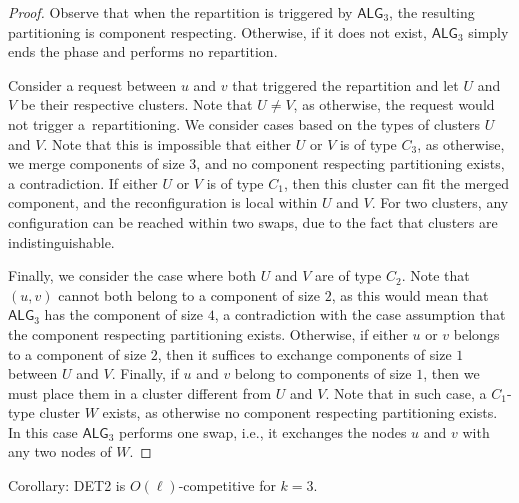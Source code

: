 \documentclass[manuscript,screen=true, review, anonymous]{acmart}
\newcommand{\TAlg}{{\ensuremath{\textsf{ALG}_{3}}}\xspace}
\begin{document}
\begin{proof}
	Observe that when the repartition is triggered by \TAlg, the resulting partitioning is component respecting.
	Otherwise, if it does not exist, \TAlg simply ends the phase and performs no repartition.
	
	
	Consider a request between $u$ and $v$ that triggered the repartition and let $U$ and $V$ be their respective clusters.
	Note that $U\neq V$,
	as otherwise, the request would not trigger a~repartitioning.
	We consider cases based on the types of clusters $U$ and $V$.
	Note that this is impossible that either $U$ or $V$ is of type $C_3$, as otherwise, we merge components of size $3$, and no component respecting partitioning exists, a contradiction.
	If either $U$ or $V$ is of type $C_1$, then this cluster can fit the merged component, and the reconfiguration is local within $U$ and $V$.
	For two clusters, any configuration can be reached within two swaps, due to the fact that clusters are indistinguishable.
	
	Finally, we consider the case where both $U$ and $V$ are of type $C_2$. Note that $(u,v)$ cannot both belong to a component of size $2$, as this would mean that \TAlg has the component of size $4$, a contradiction with the case assumption that the component respecting partitioning exists. 
	Otherwise, if either $u$ or $v$ belongs to a component of size $2$, then it suffices to exchange components of size $1$ between $U$ and $V$.
	Finally, if $u$ and $v$ belong to components of size $1$, then we must place them in a cluster different from $U$ and $V$.
	Note that in such case, a $C_1$-type cluster $W$ exists, as otherwise no component respecting partitioning exists. In this case \TAlg performs one swap, i.e., it exchanges the nodes $u$ and $v$ with any two nodes of $W$.
\end{proof}

Corollary: DET2 is $O(\ell)$-competitive for $k=3$.
\end{document}
